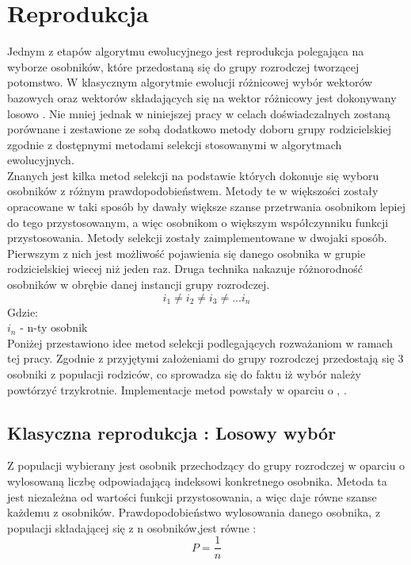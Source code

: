 \chapter{Reprodukcja}\label{metody_reprodukcji}

Jednym z etapów algorytmu ewolucyjnego jest reprodukcja polegająca na wyborze osobników, które przedostaną się do grupy rozrodczej tworzącej potomstwo. W klasycznym algorytmie ewolucji różnicowej wybór wektorów bazowych oraz wektorów składających się na wektor różnicowy jest dokonywany losowo \cite{diff2}. Nie mniej jednak w niniejszej pracy w celach doświadczalnych zostaną porównane i zestawione ze sobą dodatkowo metody doboru grupy rodzicielskiej zgodnie z dostępnymi metodami selekcji stosowanymi w algorytmach ewolucyjnych.\\

Znanych jest kilka metod selekcji na podstawie których dokonuje się wyboru osobników z różnym prawdopodobieństwem. Metody te w większości zostały opracowane w taki sposób by dawały większe szanse przetrwania osobnikom lepiej do tego przystosowanym, a więc osobnikom o większym współczynniku funkcji przystosowania. Metody selekcji zostały zaimplementowane w dwojaki sposób. Pierwszym z nich jest możliwość pojawienia się danego osobnika w grupie rodzicielskiej wiecej niż jeden raz. Druga technika nakazuje różnorodność osobników w obrębie danej instancji grupy rozrodczej.\\
$$
i_{1} \ne i_{2} \ne i_{3} \ne ... i_{n}
$$
Gdzie:\\
$i_{n}$ - n-ty osobnik\\

Poniżej przestawiono idee metod selekcji podlegających rozważaniom w ramach tej pracy. Zgodnie z przyjętymi założeniami do grupy rozrodczej przedostają się 3 osobniki z populacji rodziców, co sprowadza się do faktu iż wybór należy powtórzyć trzykrotnie. Implementacje metod powstały w oparciu o \cite{maszynowe_sel}, \cite{gracjan}.


\section{Klasyczna reprodukcja : Losowy wybór}\label{sec:strukturaDokumentu}

Z populacji wybierany jest osobnik przechodzący do grupy rozrodczej w oparciu o  wylosowaną liczbę odpowiadającą indeksowi konkretnego osobnika. Metoda ta jest niezależna od wartości funkcji przystosowania, a więc daje równe szanse każdemu z osobników. Prawdopodobieństwo wylosowania danego osobnika, z populacji składającej się z n osobników,jest równe :
\vspace{0,4cm}
$$
P = \frac{1}{n}
$$

